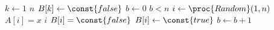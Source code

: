 \subsection{} %

\subsection{} %
\subsection{} %
\subsection{} %
\subsection{} %
\subsection{} %
\subsection{} %

\problems

\subsection{} %

\subsubsection{} %
\subsubsection{} %

\subsection{} %

\subsubsection{} %
\begin{codebox}
\li	\For $k\gets1$ \To $n$
\li	 \Do
			$B[k]\gets\const{false}$
		\End
\li	$b\gets0$
\li	\While $b<n$
\li		\Do
			$i\gets\proc{Random}(1,n)$
\li			\If $A[i]=x$
\li				\Then
					\Return $i$
\li				\ElseIf $B[i]=\const{false}$
\li					\Then
						$B[i]\gets\const{true}$
\li						$b\gets b+1$
					\End
				\End
		\End
\li	\Return {}
\end{codebox}

